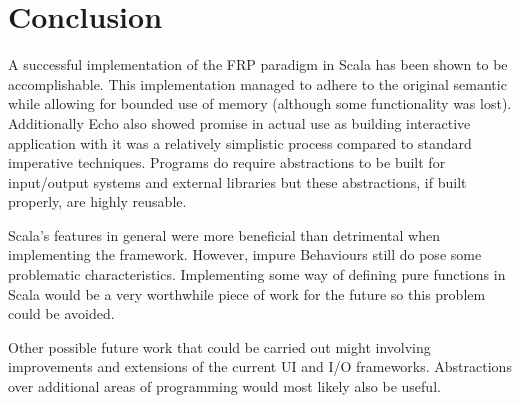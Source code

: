 \chapter{Conclusion}

A successful implementation of the FRP paradigm in Scala has been shown to be accomplishable. This implementation
managed to adhere to the original semantic while allowing for bounded use of memory (although some functionality was
lost). Additionally Echo also showed promise in actual use as building interactive application with it
was a relatively simplistic process compared to standard imperative techniques. Programs do require abstractions
to be built for input/output systems and external libraries but these abstractions, if built properly, are highly
reusable.

Scala's features in general were more beneficial than detrimental when implementing the framework. However,
impure Behaviours still do pose some problematic characteristics. Implementing some way of defining pure functions
in Scala would be a very worthwhile piece of work for the future so this problem could be avoided.

Other possible future work that could be carried out might involving improvements and extensions of the current UI
and I/O frameworks. Abstractions over additional areas of programming would most likely also be useful.